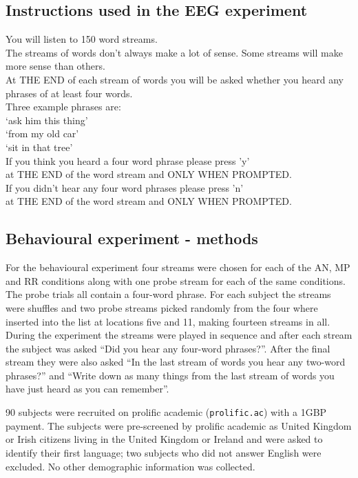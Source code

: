 \documentclass[10pt,letterpaper]{article}
\begin{document}
\subsection*{Instructions used in the EEG experiment}

You will listen to 150 word streams. \\[0.5cm]
The streams of words don't always make a lot of sense.
Some streams will make more sense than others.\\[0.5cm]
At THE END of each stream of words you will be asked whether
you heard any phrases of at least four words.\\[0.5cm]
Three example phrases are:\\[0.5cm]
`ask him this thing'  \\
`from my old car'\\
`sit in that tree'\\[0.5cm]
If you think you heard a four word phrase please press 'y'\\
at THE END of the word stream and ONLY WHEN PROMPTED.\\[0.5cm]
If you didn't hear any four word phrases please press 'n'\\
at THE END of the word stream and ONLY WHEN PROMPTED.\\

\newpage


\subsection*{Behavioural experiment - methods}

For the behavioural experiment four streams were chosen for each of
the AN, MP and RR conditions along with one probe stream for each of
the same conditions. The probe trials all contain a four-word
phrase. For each subject the streams were shuffles and two probe
streams picked randomly from the four where inserted into the list at
locations five and 11, making fourteen streams in all. During the
experiment the streams were played in sequence and after each stream
the subject was asked ``Did you hear any four-word phrases?''. After
the final stream they were also asked ``In the last stream of words
you hear any two-word phrases?'' and ``Write down as many things from
the last stream of words you have just heard as you can remember''.

90 subjects were recruited on prolific academic (\texttt{prolific.ac})
with a 1GBP payment. The subjects were pre-screened by prolific academic
as United Kingdom or Irish citizens living in the United Kingdom or
Ireland and were asked to identify their first language; two subjects
who did not answer English were excluded. No other demographic
information was collected.
\end{document}

